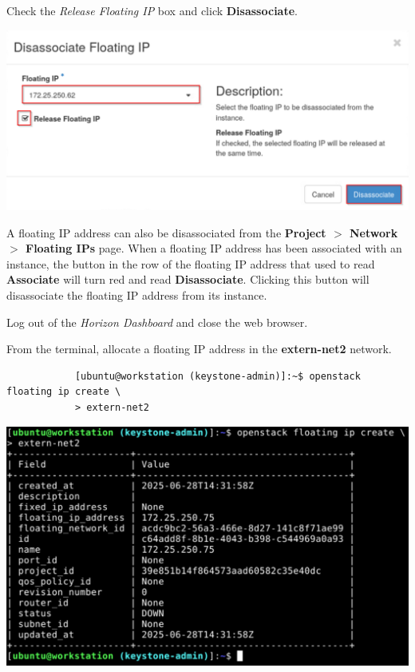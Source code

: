 \documentclass[letterpaper, 12pt]{article}
\begin{document}
\begin{enumerate}
    \begin{labstep}
        Check the \textit{Release Floating IP} box and click \textbf{Disassociate}.

        \begin{center}
            \includegraphics[width=\linewidth]{images/part3/step12.png}
        \end{center}
    \end{labstep}

    \begin{tipbox}
        A floating IP address can also be disassociated from the \textbf{Project $>$ Network $>$ Floating IPs} page.
        When a floating IP address has been associated with an instance, the button in the row of the floating IP address that used to read \textbf{Associate} will turn red and read \textbf{Disassociate}.
        Clicking this button will disassociate the floating IP address from its instance.
    \end{tipbox}

    \begin{labstep}
        Log out of the \textit{Horizon Dashboard} and close the web browser.
    \end{labstep}

    \begin{labstep}
        From the terminal, allocate a floating IP address in the \textbf{extern-net2} network.
        \begin{lstlisting}
            [ubuntu@workstation (keystone-admin)]:~$ openstack floating ip create \
            > extern-net2
        \end{lstlisting}

        \begin{center}
            \includegraphics[width=\linewidth]{images/part3/step14.png}
        \end{center}
    \end{labstep}


\end{enumerate}
\end{document}
